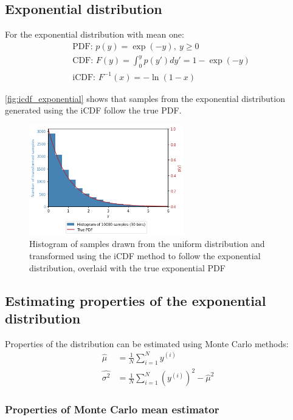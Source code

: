 \documentclass[a4paper]{article}
\begin{document}
\subsection{Exponential distribution}
For the exponential distribution with mean one:
\begin{align*}
    & \text{PDF: } p(y) = \exp(-y), \ y \geq 0 \\
    & \text{CDF: } F(y) = \int_0^y p(y') dy' = 1 - \exp(-y) \\
    & \text{iCDF: } F^{-1}(x) = -\ln(1 - x)
\end{align*}

\autoref{fig:icdf_exponential} shows that samples from the exponential distribution generated using the iCDF follow the
true PDF.

\begin{figure}[h]
    \centering
    \includegraphics[width=0.6\textwidth]{figures/icdf_exponential.png}
    \caption{Histogram of samples drawn from the uniform distribution and transformed using the iCDF method to follow the
    exponential distribution, overlaid with the true exponential PDF}
    \label{fig:icdf_exponential}
\end{figure}

\subsection{Estimating properties of the exponential distribution}

Properties of the distribution can be estimated using Monte Carlo methods:
\begin{align*}
    \hat{\mu} &= \frac{1}{N} \sum_{i=1}^N y^{(i)} \\
    \hat{\sigma^2} &= \frac{1}{N} \sum_{i=1}^N \left(y^{(i)}\right)^2 - \hat{\mu}^2
\end{align*}

\subsubsection{Properties of Monte Carlo mean estimator}
\end{document}
